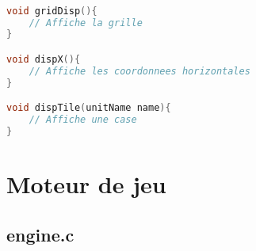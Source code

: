 \documentclass[a4paper,10pt]{extreport}
\begin{document}
\begin{lstlisting}[language=c]

void gridDisp(){
	// Affiche la grille
}

void dispX(){
	// Affiche les coordonnees horizontales
}

void dispTile(unitName name){
	// Affiche une case
}

\end{lstlisting}

\part{Moteur de jeu}

\chapter{engine.c}
\vspace{-1cm}
\end{document}
